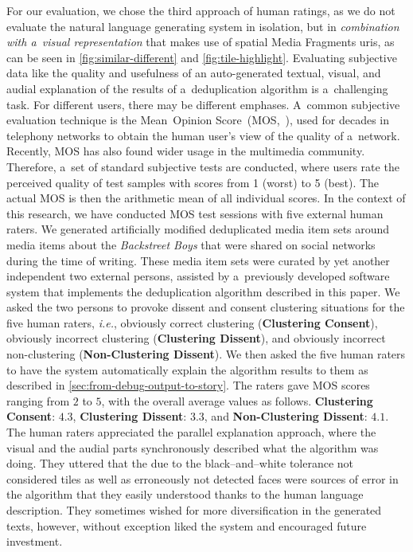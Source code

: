 \documentclass{article}
\begin{document}
For our evaluation, we chose the third approach of human ratings,
as we do not evaluate the natural language generating system in isolation,
but in \emph{combination with a~visual representation}
that makes use of spatial Media Fragments {\sc uri}s,
as can be seen in \autoref{fig:similar-different}
and \autoref{fig:tile-highlight}.
Evaluating subjective data like the quality and usefulness 
of an auto-generated textual, visual, and audial explanation
of the results of a~deduplication algorithm
is a~challenging task.
For different users, there may be different emphases.
A~common subjective evaluation technique
is the Mean~Opinion Score~(MOS,~\cite{itu1998mos}),
used for decades in telephony networks to
obtain the human user's view of the quality of a~network.
Recently, MOS has also found wider usage in the multimedia community.
Therefore, a~set of standard subjective tests are conducted,
where users rate the perceived quality of test samples
with scores from 1 (worst) to 5 (best).
The actual MOS is then the arithmetic mean of all individual scores.
In the context of this research, we have conducted MOS test sessions
with five external human raters.
We generated artificially modified deduplicated media item sets
around media items about the \emph{Backstreet Boys}
that were shared on social networks during the time of writing.
These media item sets were curated by yet another independent two
external persons, assisted by a~previously developed
software system that implements the deduplication algorithm
described in this paper.
We asked the two persons to provoke dissent and
consent clustering situations for the five human raters,
\emph{i.e.}, obviously correct clustering (\textbf{Clustering Consent}),
obviously incorrect clustering (\textbf{Clustering Dissent}),
and obviously incorrect non-clustering (\textbf{Non-Clustering Dissent}).
We then asked the five human raters to have the system
automatically explain the algorithm results to them
as described in \autoref{sec:from-debug-output-to-story}.
The raters gave MOS scores ranging from $2$ to $5$,
with the overall average values as follows.
\textbf{Clustering Consent}: $4.3$, \textbf{Clustering Dissent}: $3.3$,
and \textbf{Non-Clustering Dissent}: $4.1$.
The human raters appreciated the parallel explanation approach,
where the visual and the audial parts synchronously described
what the algorithm was doing.
They uttered that the due to the black--and--white tolerance
not considered tiles as well as erroneously not detected faces
were sources of error in the algorithm that they easily understood
thanks to the human language description.
They sometimes wished for more diversification in the generated texts,
however, without exception liked the system and encouraged future investment.
\end{document}
